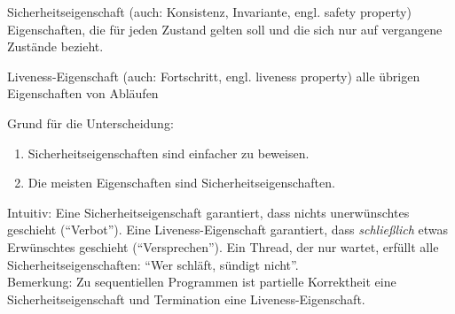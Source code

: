 \begin{description}
\item {Sicherheitseigenschaft (auch: Konsistenz, Invariante, engl. safety property)} Eigenschaften, die für jeden Zustand gelten soll und die sich nur auf vergangene Zustände bezieht.
\item {Liveness-Eigenschaft (auch: Fortschritt, engl. liveness property)} alle übrigen Eigenschaften von Abläufen
\end{description}
Grund für die Unterscheidung:
\begin{enumerate}
\item Sicherheitseigenschaften sind einfacher zu beweisen.
\item Die meisten Eigenschaften sind Sicherheitseigenschaften.
\end{enumerate}
Intuitiv: Eine Sicherheitseigenschaft garantiert, dass nichts unerwünschtes geschieht ("`Verbot"'). Eine Liveness-Eigenschaft garantiert, dass \emph{schließlich} etwas Erwünschtes geschieht ("`Versprechen"'). Ein Thread, der nur wartet, erfüllt alle Sicherheitseigenschaften: "`Wer schläft, sündigt nicht"'.\\
Bemerkung: Zu sequentiellen Programmen ist partielle Korrektheit eine Sicherheitseigenschaft und Termination eine Liveness-Eigenschaft.

